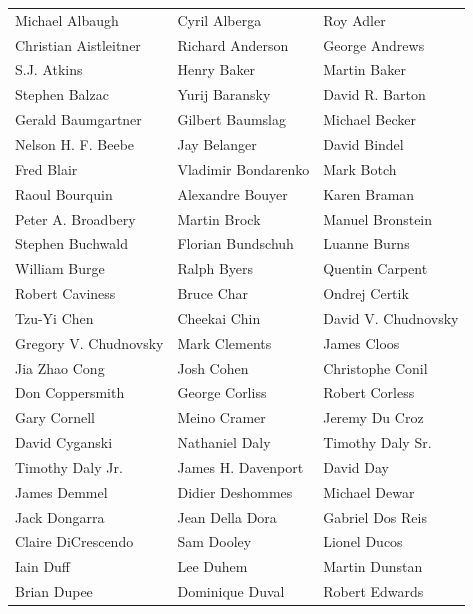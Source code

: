 \begin{tabular}{lll}
Michael Albaugh        & Cyril Alberga          & Roy Adler\\
Christian Aistleitner  & Richard Anderson       & George Andrews\\
S.J. Atkins            & Henry Baker            & Martin Baker\\
Stephen Balzac         & Yurij Baransky         & David R. Barton\\
Gerald Baumgartner     & Gilbert Baumslag       & Michael Becker\\
Nelson H. F. Beebe     & Jay Belanger           & David Bindel\\
Fred Blair             & Vladimir Bondarenko    & Mark Botch\\
Raoul Bourquin         & Alexandre Bouyer       & Karen Braman\\
Peter A. Broadbery     & Martin Brock           & Manuel Bronstein\\
Stephen Buchwald       & Florian Bundschuh      & Luanne Burns\\
William Burge          & Ralph Byers            & Quentin Carpent\\
Robert Caviness        & Bruce Char             & Ondrej Certik\\
Tzu-Yi Chen            & Cheekai Chin           & David V. Chudnovsky\\
Gregory V. Chudnovsky  & Mark Clements          & James Cloos\\
Jia Zhao Cong          & Josh Cohen             & Christophe Conil\\
Don Coppersmith        & George Corliss         & Robert Corless\\
Gary Cornell           & Meino Cramer           & Jeremy Du Croz\\
David Cyganski         & Nathaniel Daly         & Timothy Daly Sr.\\
Timothy Daly Jr.       & James H. Davenport     & David Day\\
James Demmel           & Didier Deshommes       & Michael Dewar\\
Jack Dongarra          & Jean Della Dora        & Gabriel Dos Reis\\
Claire DiCrescendo     & Sam Dooley             & Lionel Ducos\\
Iain Duff              & Lee Duhem              & Martin Dunstan\\
Brian Dupee            & Dominique Duval        & Robert Edwards\\

\end{tabular}
